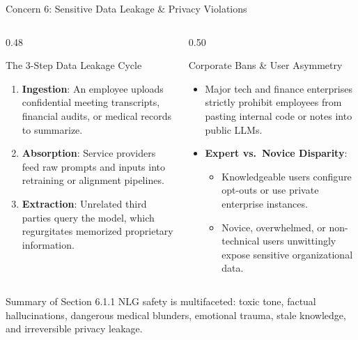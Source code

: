 \documentclass[aspectratio=169, 10pt]{beamer}
\begin{document}
\begin{frame}{Concern 6: Sensitive Data Leakage \& Privacy Violations}
  \begin{columns}[T]
    \begin{column}{0.48\textwidth}
      \begin{block}{The 3-Step Data Leakage Cycle}
        \begin{enumerate}
          \item \textbf{Ingestion}: An employee uploads confidential meeting transcripts, financial audits, or medical records to summarize.
          \item \textbf{Absorption}: Service providers feed raw prompts and inputs into retraining or alignment pipelines.
          \item \textbf{Extraction}: Unrelated third parties query the model, which regurgitates memorized proprietary information.
        \end{enumerate}
      \end{block}
    \end{column}

    \begin{column}{0.50\textwidth}
      \begin{alertbox}{Corporate Bans \& User Asymmetry}
        \begin{itemize}
          \item Major tech and finance enterprises strictly prohibit employees from pasting internal code or notes into public LLMs.
          \item \textbf{Expert vs.\ Novice Disparity}:
          \begin{itemize}
            \item Knowledgeable users configure opt-outs or use private enterprise instances.
            \item Novice, overwhelmed, or non-technical users unwittingly expose sensitive organizational data.
          \end{itemize}
        \end{itemize}
      \end{alertbox}
    \end{column}
  \end{columns}

  \vskip 3mm
  \begin{exampleblock}{Summary of Section 6.1.1}
    NLG safety is multifaceted: toxic tone, factual hallucinations, dangerous medical blunders, emotional trauma, stale knowledge, and irreversible privacy leakage.
  \end{exampleblock}
\end{frame}
\end{document}
